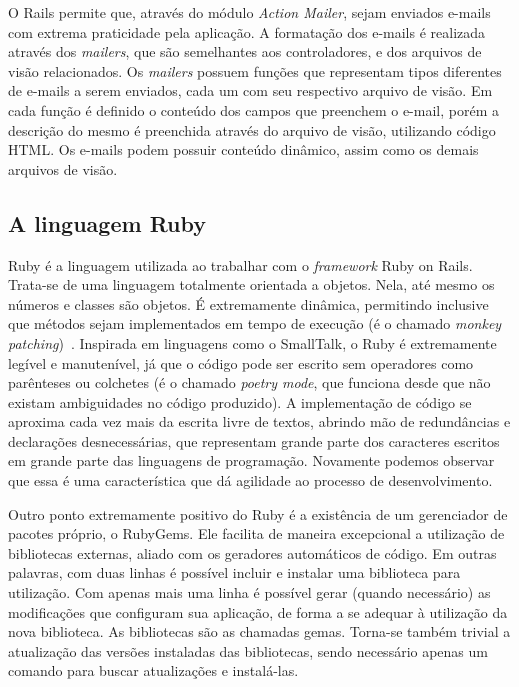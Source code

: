 O Rails permite que, através do módulo \textit{Action Mailer}, sejam enviados e-mails com extrema praticidade pela aplicação. A formatação dos e-mails é realizada através dos \textit{mailers}, que são semelhantes aos controladores, e dos arquivos de visão relacionados. Os \textit{mailers} possuem funções que representam tipos diferentes de e-mails a serem enviados, cada um com seu respectivo arquivo de visão. Em cada função é definido o conteúdo dos campos que preenchem o e-mail, porém a descrição do mesmo é preenchida através do arquivo de visão, utilizando código HTML. Os e-mails podem possuir conteúdo dinâmico, assim como os demais arquivos de visão.

\subsection{A linguagem Ruby}

Ruby é a linguagem utilizada ao trabalhar com o \textit{framework} Ruby on Rails. Trata-se de uma linguagem totalmente orientada a objetos. Nela, até mesmo os números e classes são objetos. É extremamente dinâmica, permitindo inclusive que métodos sejam implementados em tempo de execução (é o chamado \textit{monkey patching})~\cite{eloquent_ruby}. Inspirada em linguagens como o SmallTalk, o Ruby é extremamente legível e manutenível, já que o código pode ser escrito sem operadores como parênteses ou colchetes (é o chamado \textit{poetry mode}, que funciona desde que não existam ambiguidades no código produzido). A implementação de código se aproxima cada vez mais da escrita livre de textos, abrindo mão de redundâncias e declarações desnecessárias, que representam grande parte dos caracteres escritos em grande parte das linguagens de programação. Novamente podemos observar que essa é uma característica que dá agilidade ao processo de desenvolvimento.

Outro ponto extremamente positivo do Ruby é a existência de um gerenciador de pacotes próprio, o RubyGems. Ele facilita de maneira excepcional a utilização de bibliotecas externas, aliado com os geradores automáticos de código. Em outras palavras, com duas linhas é possível incluir e instalar uma biblioteca para utilização. Com apenas mais uma linha é possível gerar (quando necessário) as modificações que configuram sua aplicação, de forma a se adequar à utilização da nova biblioteca. As bibliotecas são as chamadas gemas. Torna-se também trivial a atualização das versões instaladas das bibliotecas, sendo necessário apenas um comando para buscar atualizações e instalá-las.


